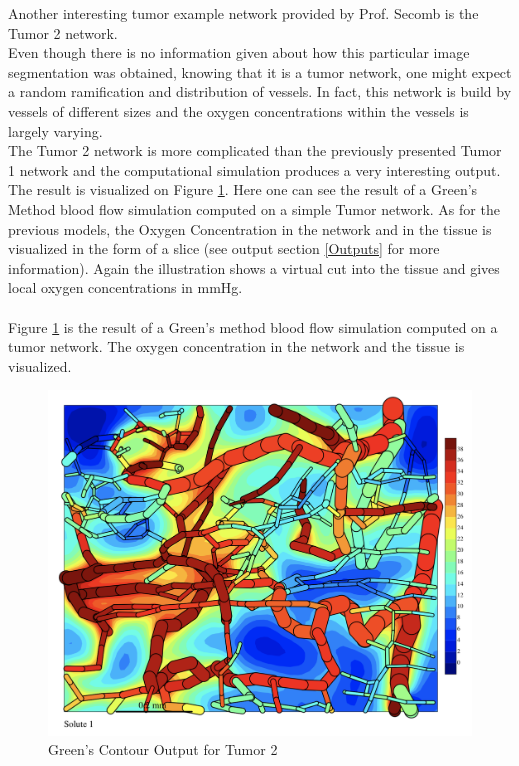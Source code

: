 Another interesting tumor example network provided by Prof. Secomb is the Tumor 2 network.
\\Even though there is no information given about how this particular image segmentation was obtained, knowing that it is a tumor network, one might expect a random ramification and distribution of vessels. In fact, this network is build by vessels of different sizes and the oxygen concentrations within the vessels is largely varying.
\\The Tumor 2 network is more complicated than the previously presented Tumor 1 network and the computational simulation produces a very interesting output. The result is visualized on Figure \ref{fig:Contour_TumorDuke}. Here one can see the result of a Green's Method blood flow simulation computed on a simple Tumor network. As for the previous models, the Oxygen Concentration in the network and in the tissue is visualized in the form of a slice (see output section \ref{Outputs} for more information). Again the illustration shows a virtual cut into the tissue and gives local oxygen concentrations in mmHg.\\\\
Figure \ref{fig:Contour_TumorDuke}  is the result of a Green's method blood flow simulation computed on a tumor network. The oxygen concentration in the network and the tissue is visualized.\\
\begin{figure}[h]
\centering
\includegraphics[width=120mm]{Contour_TumorDuke}
\caption{\footnotesize Green's Contour Output for Tumor 2}
\label{fig:Contour_TumorDuke}
\end{figure}\\
